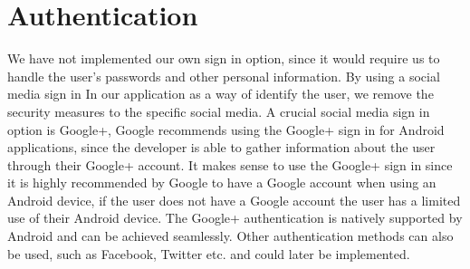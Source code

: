 \section{Authentication}
We have not implemented our own sign in option, since it would require us to handle the user's passwords and other personal information.
By using a social media sign in In our application as a way of identify the user, we remove the security measures to the specific social media.
A crucial social media sign in option is Google+, Google recommends using the Google+ sign in for Android applications, since the developer is able to gather information about the user through their Google+ account.
It makes sense to use the Google+ sign in since it is highly recommended by Google to have a Google account when using an Android device, if the user does not have a Google account the user has a limited use of their Android device.
The Google+ authentication is natively supported by Android and can be achieved seamlessly.
Other authentication methods can also be used, such as Facebook, Twitter etc. and could later be implemented.

